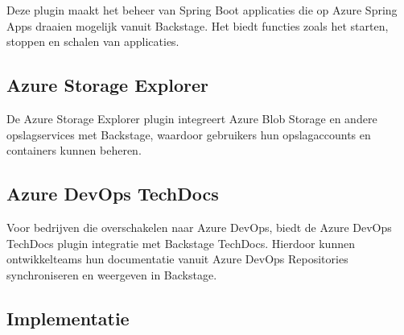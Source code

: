 Deze plugin maakt het beheer van Spring Boot applicaties die op Azure Spring Apps draaien mogelijk vanuit Backstage. Het biedt functies zoals het starten, stoppen en schalen van applicaties.

\subsection{Azure Storage Explorer}

De Azure Storage Explorer plugin integreert Azure Blob Storage en andere opslagservices met Backstage, waardoor gebruikers hun opslagaccounts en containers kunnen beheren.

\subsection{Azure DevOps TechDocs}

Voor bedrijven die overschakelen naar Azure DevOps, biedt de Azure DevOps TechDocs plugin integratie met Backstage TechDocs. Hierdoor kunnen ontwikkelteams hun documentatie vanuit Azure DevOps Repositories synchroniseren en weergeven in Backstage.

\subsection{Implementatie}
